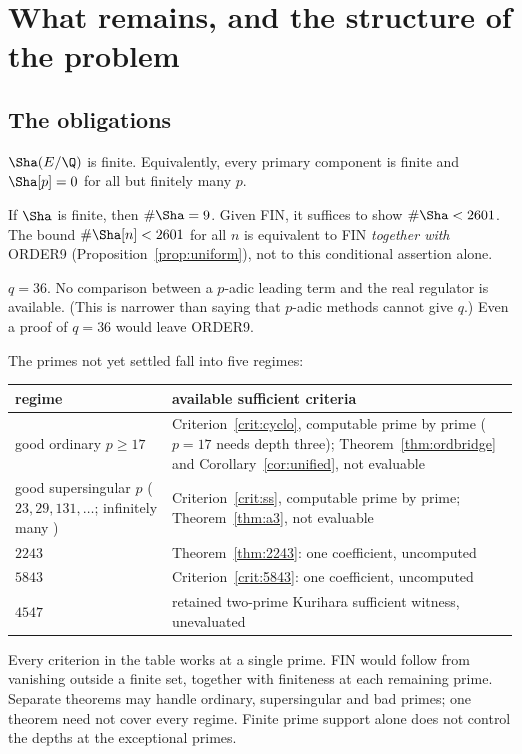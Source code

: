 \section{What remains, and the structure of the problem}\label{sec:remaining}

\subsection{The obligations}
\begin{obligation}
$\Sha(E/\Q)$ is finite. Equivalently, every primary component is finite and $\Sha[p]=0$ for all but finitely many $p$.
\end{obligation}
\begin{obligation}
If $\Sha$ is finite, then $\#\Sha=9$. Given FIN, it suffices to show $\#\Sha<2601$. The bound $\#\Sha[n]<2601$ for all $n$ is equivalent to FIN \emph{together with} ORDER9 (Proposition~\ref{prop:uniform}), not to this conditional assertion alone.
\end{obligation}
\begin{obligation}[\cid{O.3}, Q36]
$q=36$. No comparison between a $p$-adic leading term and the real regulator is available. (This is narrower than saying that $p$-adic methods cannot give $q$.) Even a proof of $q=36$ would leave ORDER9.
\end{obligation}

The primes not yet settled fall into five regimes:

\begin{center}
\begin{tabular}{@{}p{}p{}@{}}
\toprule
regime & available sufficient criteria\\ \midrule
good ordinary $p\ge17$ & Criterion~\ref{crit:cyclo}, computable prime by prime ($p=17$ needs depth three); Theorem~\ref{thm:ordbridge} and Corollary~\ref{cor:unified}, not evaluable\\
good supersingular $p$ ($23,29,131,\dots$; infinitely many \cite{elkies}) & Criterion~\ref{crit:ss}, computable prime by prime; Theorem~\ref{thm:a3}, not evaluable\\
$2243$ & Theorem~\ref{thm:2243}: one coefficient, uncomputed\\
$5843$ & Criterion~\ref{crit:5843}: one coefficient, uncomputed\\
$4547$ & retained two-prime Kurihara sufficient witness, unevaluated\\ \bottomrule
\end{tabular}
\end{center}
Every criterion in the table works at a single prime. FIN would follow from vanishing outside a finite set, together with finiteness at each remaining prime. Separate theorems may handle ordinary, supersingular and bad primes; one theorem need not cover every regime. Finite prime support alone does not control the depths at the exceptional primes.

